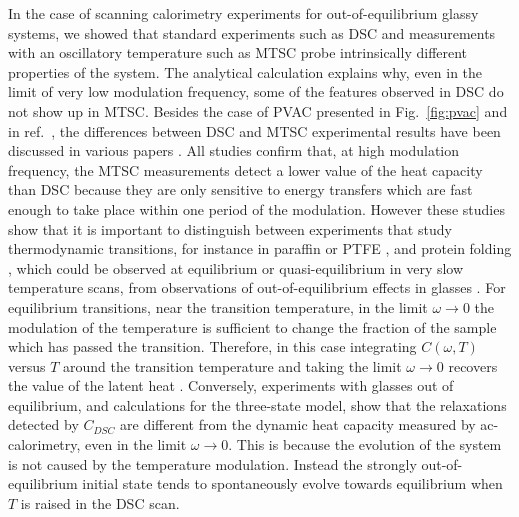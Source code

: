 \documentclass[pre,a4paper,twocolumn,superscriptaddress,%
floatfix]{revtex4}
\begin{document}
\medskip
In the case of scanning calorimetry experiments for
  out-of-equilibrium glassy systems, we showed
that standard experiments such as DSC and measurements with an oscillatory
temperature such as MTSC probe intrinsically different properties of the
system. The analytical
calculation explains why, even in the limit of very low modulation frequency,
some of the features observed in DSC do not show up in MTSC.
Besides the case of PVAC presented in Fig.~\ref{fig:pvac} and
  in ref.~\cite{LAARRAJ},
  the differences between DSC and MTSC experimental results
have been discussed in various papers
\cite{ANDROSCH,SARUYAMA,GARDEN2004,GARDEN2005}. All studies confirm that, at
high modulation frequency, the MTSC measurements detect a lower value of the
heat capacity than DSC because they are only sensitive to energy transfers
which are fast enough to take place within one period of the
modulation. However these studies show that it is important to distinguish
between experiments that study thermodynamic transitions, for instance in
paraffin \cite{SARUYAMA} or PTFE \cite{ANDROSCH,GARDEN2005}, and protein
folding \cite{GARDEN2004}, which could be observed at equilibrium or
quasi-equilibrium in very slow temperature scans,
from observations of out-of-equilibrium effects in glasses \cite{LAARRAJ}.
For equilibrium transitions, near the transition temperature, in the limit
$\omega \to 0$ the modulation of 
the temperature is sufficient to change the fraction of the sample which has
passed the transition. Therefore, in this case integrating
$C(\omega,T)$ versus $T$ around the transition temperature and taking the
limit $\omega \to 0$ recovers the value of the latent heat
\cite{GARDEN2005}. Conversely, experiments with glasses out of equilibrium, and
calculations for the three-state model, show that the relaxations detected by
$C_{DSC}$ are different from the dynamic heat capacity measured by
ac-calorimetry, even in the limit $\omega \to 0$. This is because the
evolution of the system is not caused by the temperature modulation.
Instead the strongly out-of-equilibrium initial state tends to spontaneously
evolve towards equilibrium when $T$ is raised in the DSC scan.
\end{document}
